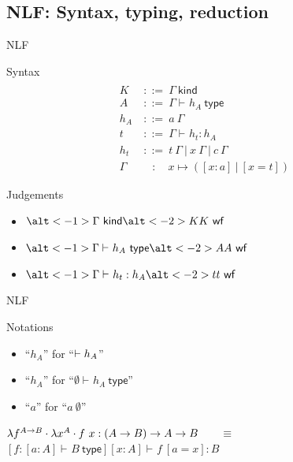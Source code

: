 \documentclass[ignorenonframetext,red]{beamer}
\newcommand\gor{\ |\ }
\newcommand\gequal{\ ::=\ }
\newcommand\postbinder{\cdot}
\newcommand\app[1]{{#1}\ }
\newcommand\tlam[2]{\ensuremath\lambda{#1}^{#2}\postbinder}
\newcommand\lam{\tlam}
\newcommand\eent[1]{\left[{#1}\right]}
\newcommand\econs[2]{{#1}\eent{#2}}
\newcommand\esing[1]{\econs{}{#1}}
\newcommand\jlangt[4]{{#2}\vdash_{\mathrm{#1}}{#3}:{#4}}
\newcommand\jlangA[3]{{#2}\vdash_{\mathrm{#1}}{#3}\mathsf{\ type}}
\newcommand\jlangK[3]{{#2}\vdash_{\mathrm{#1}}{#3}\mathsf{\ kind}}
\newcommand\jnlft[3]{\jlangt{}{#1}{#2}{#3}}
\newcommand\jnlfA[2]{\jlangA{}{#1}{#2}}
\newcommand\jnlfK[1]{{#1}\ \mathsf{kind}} %
\newcommand\jwf[1]{{#1}\ \mathsf{wf}}
\begin{document}
\subsection{NLF: Syntax, typing, reduction}

\begin{frame}{NLF}
  \begin{block}{Syntax}
    \begin{align*}
      \\[-3em]
      K &\gequal \jnlfK\Gamma \\
      A &\gequal \jnlfA\Gamma{h_A} \\
      h_A &\gequal \app a \Gamma \\
      t &\gequal \jnlft\Gamma{h_t}{h_A} \\
      h_t &\gequal \app t\Gamma \gor
      \app x\Gamma \gor \app c\Gamma \\
      \Gamma &\quad :\quad x \mapsto (\eent{x:a} \gor \eent{x=t})
    \end{align*}
  \end{block}
  \begin{overlayarea}{\textwidth}{\textwidth}
    \begin{block}{Judgements}
      \begin{itemize}
      \item $\alt<-1>{\jnlfK\Gamma}{\alt<-2> K {\jwf K}}$
      \item $\alt<-1>{\jnlfA\Gamma{h_A}}{\alt<-2> A {\jwf A}}$
      \item $\alt<-1>{\jnlft\Gamma{h_t}{h_A}}{\alt<-2> t {\jwf t}}$
      \end{itemize}
    \end{block}
  \end{overlayarea}
  \pause\pause
\end{frame}

\begin{frame}{NLF}
  \begin{block}{Notations}
    \begin{itemize}
    \item ``$h_A$'' for ``$\empty\vdash h_A$''
    \item ``$h_A$'' for ``$\jnlfA{\emptyset}{h_A}$''
    \item ``$a$'' for ``$\app a \emptyset$''
    \end{itemize}
  \end{block}
  \begin{example}
    $\lam f {A\to B} \lam x A \app f x : (A\to B)\to A\to B\qquad\equiv$\\[0.5em]
    $\jnlft
    {\econs
      {\eent{f:\jnlfA{\eent{a:A}}{B}}}
      {x:A}}
    {\app f {\esing{a=x}}}
    {B}$
  \end{example}
\end{frame}
\end{document}
